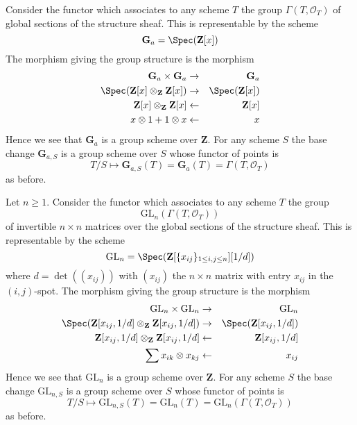 \begin{example}
\label{example-additive-group}
Consider the functor which associates
to any scheme $T$ the group $\Gamma(T, \mathcal{O}_T)$
of global sections of the structure sheaf.
This is representable by the scheme
$$
\mathbf{G}_a = \Spec(\mathbf{Z}[x])
$$
The morphism giving the group structure is the morphism
\begin{eqnarray*}
\mathbf{G}_a \times \mathbf{G}_a & \to & \mathbf{G}_a \\
\Spec(\mathbf{Z}[x] \otimes_{\mathbf{Z}} \mathbf{Z}[x])
& \to &
\Spec(\mathbf{Z}[x]) \\
\mathbf{Z}[x] \otimes_{\mathbf{Z}} \mathbf{Z}[x]
& \leftarrow &
\mathbf{Z}[x] \\
x \otimes 1 + 1 \otimes x & \leftarrow & x
\end{eqnarray*}
Hence we see that $\mathbf{G}_a$ is a group scheme over $\mathbf{Z}$.
For any scheme $S$ the base change $\mathbf{G}_{a, S}$ is a
group scheme over $S$ whose functor of points is
$$
T/S
\longmapsto
\mathbf{G}_{a, S}(T) = \mathbf{G}_a(T) = \Gamma(T, \mathcal{O}_T)
$$
as before.
\end{example}

\begin{example}
\label{example-general-linear-group}
Let $n \geq 1$.
Consider the functor which associates
to any scheme $T$ the group
$$
\text{GL}_n(\Gamma(T, \mathcal{O}_T))
$$
of invertible $n \times n$ matrices over
the global sections of the structure sheaf.
This is representable by the scheme
$$
\text{GL}_n = \Spec(\mathbf{Z}[\{x_{ij}\}_{1 \leq i, j \leq n}][1/d])
$$
where $d = \det((x_{ij}))$ with $(x_{ij})$ the $n \times n$ matrix
with entry $x_{ij}$ in the $(i, j)$-spot.
The morphism giving the group structure is the morphism
\begin{eqnarray*}
\text{GL}_n \times \text{GL}_n & \to & \text{GL}_n \\
\Spec(\mathbf{Z}[x_{ij}, 1/d] \otimes_{\mathbf{Z}}
\mathbf{Z}[x_{ij}, 1/d])
& \to &
\Spec(\mathbf{Z}[x_{ij}, 1/d]) \\
\mathbf{Z}[x_{ij}, 1/d] \otimes_{\mathbf{Z}} \mathbf{Z}[x_{ij}, 1/d]
& \leftarrow &
\mathbf{Z}[x_{ij}, 1/d] \\
\sum x_{ik} \otimes x_{kj} & \leftarrow & x_{ij}
\end{eqnarray*}
Hence we see that $\text{GL}_n$ is a group scheme over $\mathbf{Z}$.
For any scheme $S$ the base change $\text{GL}_{n, S}$ is a
group scheme over $S$ whose functor of points is
$$
T/S
\longmapsto
\text{GL}_{n, S}(T) = \text{GL}_n(T) =\text{GL}_n(\Gamma(T, \mathcal{O}_T))
$$
as before.
\end{example}

